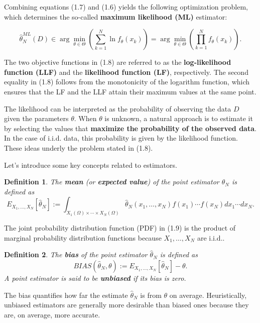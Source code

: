 \documentclass{report}
\newtheorem{definition}{Definition}[chapter]
\begin{document}
Combining equations (1.7) and (1.6) yields the following optimization problem, which determines the so-called \textbf{maximum likelihood (ML)} estimator:

\begin{equation}
\hat{\theta}^{ML}_N(D) \in \arg\min_{\theta \in \Theta}\left(\sum_{k=1}^N\ln f_\theta(x_k)  \right) = \arg\min_{\theta \in \Theta}\left(\prod_{k=1}^N f_\theta(x_k) \right).
\end{equation}

The two objective functions in (1.8) are referred to as the \textbf{log-likelihood function (LLF)} and the \textbf{likelihood function (LF)}, respectively.
The second equality in (1.8) follows from the monotonicity of the logarithm function, which ensures that the LF and the LLF attain their maximum values at the same point.

The likelihood can be interpreted as the probability of observing the data $D$ given the parameters $\theta$. When $\theta$ is unknown, a natural approach is to estimate it by selecting the values that \textbf{maximize the probability of the observed data}. In the case of i.i.d. data, this probability is given by the likelihood function. These ideas underly the problem stated in (1.8).

Let’s introduce some key concepts related to estimators.
\begin{definition}
The \textbf{mean} (or \textbf{expected value}) of the point estimator $\hat{\theta}_N$ is defined as
\begin{equation}
E_{X_1,\dots,X_N}[\hat{\theta}_N] := \int_{X_1(\Omega)\times \cdots \times X_N(\Omega)} \hat{\theta}_N(x_1,\dots,x_N)f(x_1)\cdots f(x_N) dx_1\cdots dx_N.
\end{equation}
\end{definition}

The joint probability distribution function (PDF) in (1.9) is the product of marginal probability distribution functions because $X_1,\dots,X_N$ are i.i.d..

\begin{definition}
The \textbf{bias} of the point estimator $\hat{\theta}_N$ is defined as
\begin{equation}
BIAS(\hat{\theta}_N,\theta) := E_{X_1,\dots,X_N}[\hat{\theta}_N] - \theta.
\end{equation}
A point estimator is said to be \textbf{unbiased} if its bias is zero.
\end{definition}

The bias quantifies how far the estimate $\hat{\theta}_N$ is from $\theta$ on average. Heuristically, unbiased estimators are generally more desirable than biased ones because they are, on average, more accurate.
\end{document}
